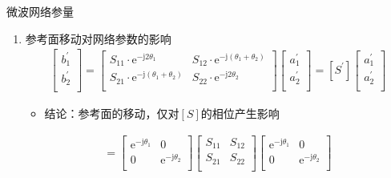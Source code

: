 \begin{frame}{微波网络参量}
    \begin{enumerate}
        \item 参考面移动对网络参数的影响
        \begin{align*}
            \begin{bmatrix*}
                b_1^{'} \\
                b_2^{'} \\
            \end{bmatrix*}
            =
            \begin{bmatrix*}
                S_{11}\cdot\mathrm{e}^{-\mathrm{j}2\theta_1} & S_{12}\cdot\mathrm{e}^{-\mathrm{j}(\theta_1+\theta_2)} \\
                S_{21}\cdot\mathrm{e}^{-\mathrm{j}(\theta_1+\theta_2)} & S_{22}\cdot \mathrm{e}^{-\mathrm{j}2\theta_2} \\
            \end{bmatrix*}
            \begin{bmatrix*}
                a_1^{'} \\
                a_2^{'} \\
            \end{bmatrix*}
            =[S^{'}]
            \begin{bmatrix*}
                a_1^{'} \\
                a_2^{'} \\
            \end{bmatrix*}
        \end{align*}
        \begin{itemize}
            \item 结论：参考面的移动，仅对$[S]$的相位产生影响
        \end{itemize}
        \begin{align*}
            [S^{'}]=
            \begin{bmatrix*}
                \mathrm{e}^{-\mathrm{j}\theta_1} & 0 \\
                0 & \mathrm{e}^{-\mathrm{j}\theta_2} \\
            \end{bmatrix*}
            \begin{bmatrix*}
                S_{11} & S_{12} \\
                S_{21} & S_{22} \\
            \end{bmatrix*}
            \begin{bmatrix*}
                \mathrm{e}^{-\mathrm{j}\theta_1} & 0 \\
                0 & \mathrm{e}^{-\mathrm{j}\theta_2} \\
            \end{bmatrix*}
        \end{align*}
    \end{enumerate}
\end{frame}

